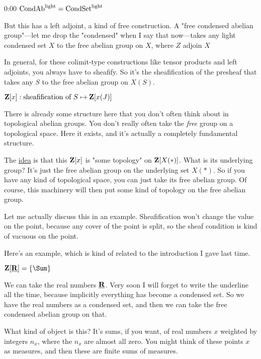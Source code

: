 \begin{unfinished}{0:00}
$\mathrm{Cond}\mathrm{Ab}^{\mathrm{light}} = \mathrm{Cond}\mathrm{Set}^{\mathrm{light}}$

But this has a left adjoint, a kind of free construction. A "free condensed abelian group"---let me drop the "condensed" when I say that now---takes any light condensed set $X$ to the free abelian group on $X$, where $Z$ adjoin $X$

In general, for these colimit-type constructions like tensor products and left adjoints, you always have to sheafify. So it's the sheafification of the presheaf that takes any $S$ to the free abelian group on $X(S)$.

$ \mathbf Z[x]: \text{sheafification of } S \mapsto \mathbf Z[x(J)]$

There is already some structure here that you don't often think about in topological abelian groups. You don't really often take the \emph{free} group on a topological space. Here it exists, and it's actually a completely fundamental structure.

The \underline{idea} is that this $\mathbf Z[x]$ is "some topology" on $\mathbf Z[X(\ast)]$. What is its underlying group? It's just the free abelian group on the underlying set $X(\ast)$. So if you have any kind of topological space, you can just take its free abelian group. Of course, this machinery will then put some kind of topology on the free abelian group.

Let me actually discuss this in an example. 
Sheafification won't change the value on the point, because any cover of the point is split, so the sheaf condition is kind of vacuous on the point.

Here's an example, which is kind of related to the introduction I gave last time. 

$\Z[\underline{\R}] = \{  \Sum \}$

We can take the real numbers $\underline{\mathbf R}$. Very soon I will forget to write the underline all the time, because implicitly everything has become a condensed set. So we have the real numbers as a condensed set, and then we can take the free condensed abelian group on that.

\begin{example}[\yt{36m14s}{}]
\end{example}

What kind of object is this? It's sums, if you want, of real numbers $x$ weighted by integers $n_x$, where the $n_x$ are almost all zero. You might think of these points $x$ as measures, and then these are finite sums of measures.


\end{unfinished}
